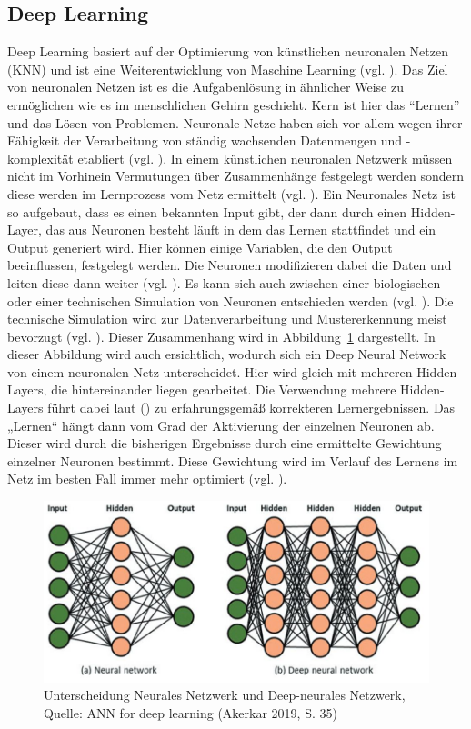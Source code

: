 \subsection{Deep Learning}
Deep Learning basiert auf der Optimierung von künstlichen neuronalen Netzen (KNN) und ist eine Weiterentwicklung von Maschine Learning (vgl. \cite[S. 1]{Georgevici.2019}). Das Ziel von neuronalen Netzen ist es die Aufgabenlösung in ähnlicher Weise zu ermöglichen wie es im menschlichen Gehirn geschieht. Kern ist hier das “Lernen” und das Lösen von Problemen. Neuronale Netze haben sich vor allem wegen ihrer Fähigkeit der Verarbeitung von ständig wachsenden Datenmengen und -komplexität etabliert (vgl. \cite[S. 373]{Welsch.2018}). In einem künstlichen neuronalen Netzwerk müssen nicht im Vorhinein Vermutungen über Zusammenhänge festgelegt werden sondern diese werden im Lernprozess vom Netz ermittelt (vgl. \cite[S. 581]{Backhaus.2018b}). Ein Neuronales Netz ist 
so aufgebaut, dass es einen bekannten Input gibt, der dann durch einen Hidden-Layer, das aus Neuronen besteht läuft in dem das Lernen stattfindet und ein Output generiert wird. Hier können einige Variablen, die den Output 
beeinflussen, festgelegt werden. 
Die Neuronen modifizieren dabei die Daten und leiten diese dann weiter (vgl. \cite[S. 373]{Welsch.2018}). Es kann sich auch zwischen einer biologischen oder einer technischen Simulation von Neuronen entschieden werden (vgl. \cite{https:www.facebook.comspektrumverlag.04.12.2014}). Die technische Simulation wird zur Datenverarbeitung und Mustererkennung meist bevorzugt (vgl. \cite{https:www.facebook.comspektrumverlag.04.12.2014}). Dieser Zusammenhang wird in Abbildung~\ref{fig:NeuralVsDeepNeural} dargestellt. 
In dieser Abbildung wird auch ersichtlich, wodurch sich ein Deep Neural Network von einem neuronalen Netz unterscheidet. Hier wird gleich mit mehreren Hidden-Layers, die hintereinander liegen gearbeitet. Die Verwendung mehrere Hidden-Layers führt dabei laut (\cite[S. 581]{Backhaus.2018b}) zu erfahrungsgemäß korrekteren Lernergebnissen. Das „Lernen“ hängt dann vom Grad der Aktivierung der einzelnen Neuronen ab. Dieser wird durch die bisherigen Ergebnisse durch eine ermittelte Gewichtung einzelner Neuronen bestimmt. Diese Gewichtung wird im Verlauf des Lernens im Netz im besten Fall immer mehr optimiert (vgl. \cite[S. 586]{Backhaus.2018b}).
\begin{figure}[ht]
\centering
\includegraphics[width=\linewidth]{pics/ANN_for_deep_learning_P35}
\caption{Unterscheidung Neurales Netzwerk und Deep-neurales Netzwerk, Quelle: ANN for deep learning (Akerkar 2019, S. 35)}
\label{fig:NeuralVsDeepNeural}
\end{figure}
